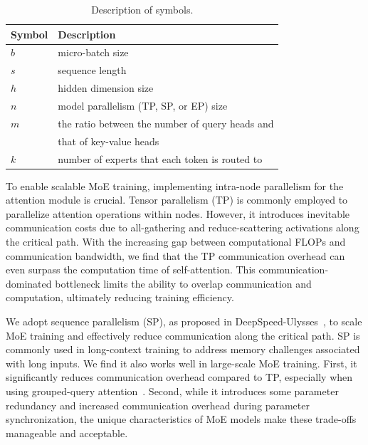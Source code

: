 \begin{table}[t!]
    \centering
    \resizebox{0.8\linewidth}{!} {
        \begin{tabular}{@{}ll@{}}
            \toprule
            Symbol & Description \\ \midrule
            $b$ & micro-batch size \\
            $s$ & sequence length \\
            $h$ & hidden dimension size \\
            $n$ & model parallelism (TP, SP, or EP) size \\
            $m$ & the ratio between the number of query heads and \\
            & that of key-value heads \\
            $k$ & number of experts that each token is routed to \\
            \bottomrule
        \end{tabular}
    }
    \caption{Description of symbols.}
    \vspace{-0.25in}
    \label{tab:design:description}
\end{table}

To enable scalable MoE training, implementing intra-node parallelism for the attention module is crucial. Tensor parallelism (TP) is commonly employed to parallelize attention operations within nodes. However, it introduces inevitable communication costs due to all-gathering and reduce-scattering activations along the critical path. With the increasing gap between computational FLOPs and communication bandwidth, we find that the TP communication overhead can even surpass the computation time of self-attention. This communication-dominated bottleneck limits the ability to overlap communication and computation, ultimately reducing training efficiency. 

We adopt sequence parallelism (SP), as proposed in DeepSpeed-Ulysses~\cite{jacobs2023deepspeed}, to scale MoE training and effectively reduce communication along the critical path. SP is commonly used in long-context training to address memory challenges associated with long inputs. We find it also works well in large-scale MoE training. First, it significantly reduces communication overhead compared to TP, especially when using grouped-query attention~\cite{ainslie2023gqa}. Second, while it introduces some parameter redundancy and increased communication overhead during parameter synchronization, the unique characteristics of MoE models make these trade-offs manageable and acceptable.

